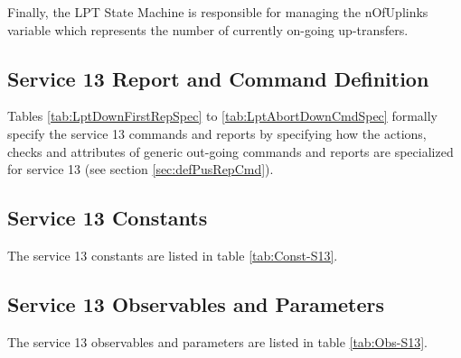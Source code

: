 \documentclass{pnp_article}
\begin{document}
Finally, the LPT State Machine is responsible for managing the nOfUplinks variable which represents the number of currently on-going up-transfers.


\subsection{Service 13 Report and Command Definition}\label{sec:serv13RepCmdDef}
Tables \ref{tab:LptDownFirstRepSpec} to \ref{tab:LptAbortDownCmdSpec} formally specify the service 13 commands and reports by specifying how the actions, checks and attributes of generic out-going commands and reports are specialized for service 13 (see section \ref{sec:defPusRepCmd}). 


\newpage
{}

\newpage
{}

\newpage
{}

\newpage
{}




\newpage
\subsection{Service 13 Constants}\label{sec:serv13Const}
The service 13 constants are listed in table \ref{tab:Const-S13}. 



\subsection{Service 13 Observables and Parameters}\label{sec:serv13Obs}
The service 13 observables and parameters are listed in table \ref{tab:Obs-S13}.

\end{document}
